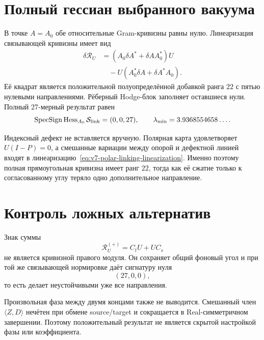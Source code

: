 \section{Полный гессиан выбранного вакуума}

В точке $A=A_0$ обе относительные Gram-кривизны равны нулю. Линеаризация
связывающей кривизны имеет вид
\begin{align}
 \delta\mathcal R_U
 &=(A_0\delta A^*+\delta A A_0^*)U\nonumber\\
 &\quad-U(A_0^*\delta A+\delta A^*A_0).
 \label{eq:v7-polar-linking-linearization}
\end{align}
Её квадрат является положительной полуопределённой добавкой ранга $22$ с
пятью нулевыми направлениями. Рёберный Hodge-блок заполняет оставшиеся
нули. Полный 27-мерный результат равен
\begin{equation}
 \operatorname{SpecSign}\operatorname{Hess}_{A_0}\mathcal S_{\rm link}
 =(0,0,27),
 \qquad
 \lambda_{\min}=3.9368554658\ldots.
 \label{eq:v7-polar-linking-vacuum-signature}
\end{equation}

Индексный дефект не вставляется вручную. Полярная карта удовлетворяет
$U(I-P)=0$, а смешанные вариации между опорой и дефектной линией входят в
линеаризацию~\eqref{eq:v7-polar-linking-linearization}. Именно поэтому
полная прямоугольная кривизна имеет ранг $22$, тогда как её сжатие только к
согласованному углу теряло одно дополнительное направление.

\section{Контроль ложных альтернатив}

Знак суммы
\begin{equation}
 \mathcal R_U^{(+)}=C_tU+UC_s
 \label{eq:v7-polar-linking-plus-channel}
\end{equation}
не является кривизной правого модуля. Он сохраняет общий фоновый угол и при
той же связывающей нормировке даёт сигнатуру нуля
\begin{equation}
 (27,0,0),
 \label{eq:v7-polar-linking-plus-fail}
\end{equation}
то есть делает неустойчивыми уже все направления.

Произвольная фаза между двумя концами также не выводится. Смешанный член
$\langle Z,D\rangle$ нечётен при обмене source/target и сокращается в
Real-симметричном завершении. Поэтому положительный результат не является
скрытой настройкой фазы или коэффициента.

